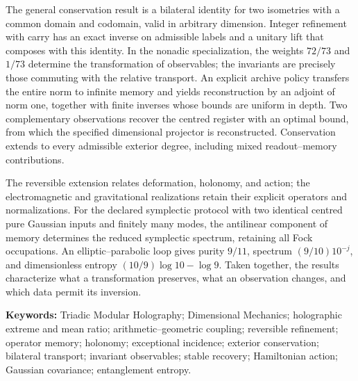 The general conservation result is a bilateral identity for two isometries with a common domain and codomain, valid in arbitrary dimension. Integer refinement with carry has an exact inverse on admissible labels and a unitary lift that composes with this identity. In the nonadic specialization, the weights \(72/73\) and \(1/73\) determine the transformation of observables; the invariants are precisely those commuting with the relative transport. An explicit archive policy transfers the entire norm to infinite memory and yields reconstruction by an adjoint of norm one, together with finite inverses whose bounds are uniform in depth. Two complementary observations recover the centred register with an optimal bound, from which the specified dimensional projector is reconstructed. Conservation extends to every admissible exterior degree, including mixed readout--memory contributions.

The reversible extension relates deformation, holonomy, and action; the electromagnetic and gravitational realizations retain their explicit operators and normalizations. For the declared symplectic protocol with two identical centred pure Gaussian inputs and finitely many modes, the antilinear component of memory determines the reduced symplectic spectrum, retaining all Fock occupations. An elliptic--parabolic loop gives purity \(9/11\), spectrum \((9/10)10^{-j}\), and dimensionless entropy \((10/9)\log10-\log9\). Taken together, the results characterize what a transformation preserves, what an observation changes, and which data permit its inversion.

\medskip
\noindent\textbf{Keywords:} Triadic Modular Holography; Dimensional Mechanics; holographic extreme and mean ratio; arithmetic--geometric coupling; reversible refinement; operator memory; holonomy; exceptional incidence; exterior conservation; bilateral transport; invariant observables; stable recovery; Hamiltonian action; Gaussian covariance; entanglement entropy.
